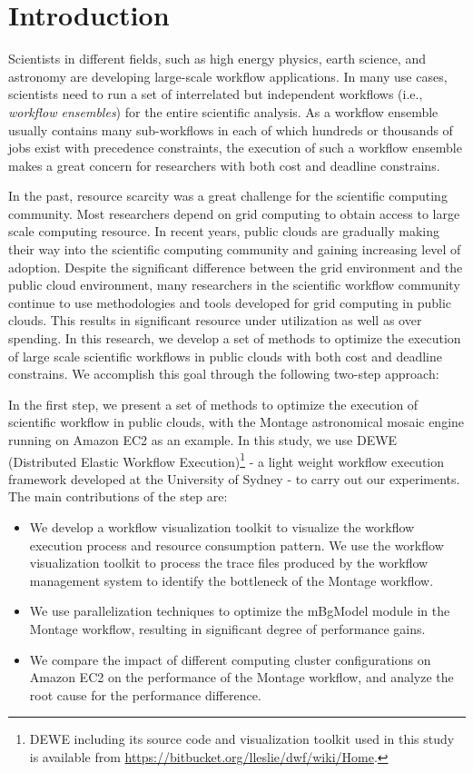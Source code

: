 \chapter{Introduction}
\label{chapter:introduction}

Scientists in different fields, such as high energy physics, earth science, and astronomy are developing large-scale workflow applications. In many use cases, scientists need to run a set of interrelated but independent workflows (i.e., \emph{workflow ensembles}) for the entire scientific analysis. As a workflow ensemble usually contains many sub-workflows in each of which hundreds or thousands of jobs exist with precedence constraints, the execution of such a workflow ensemble makes a great concern for researchers with both cost and deadline constrains.

In the past, resource scarcity was a great challenge for the scientific computing community. Most researchers depend on grid computing to obtain access to large scale computing resource. In recent years, public clouds are gradually making their way into the scientific computing community and  gaining increasing level of adoption. Despite the significant difference between the grid environment and the public cloud environment, many researchers in the scientific workflow community continue to use methodologies and tools developed for grid computing in public clouds. This results in significant resource under utilization as well as over spending. In this research, we develop a set of methods to optimize the execution of large scale scientific workflows in public clouds with both cost and deadline constrains. We accomplish this goal through the following two-step approach: 

In the first step, we present a set of methods to optimize the execution of scientific workflow in public clouds, with the Montage astronomical mosaic engine running on Amazon EC2 as an example. In this study, we use DEWE (Distributed Elastic Workflow Execution)\footnote{DEWE including its source code and visualization toolkit used in this study is available from \url{https://bitbucket.org/lleslie/dwf/wiki/Home}.} - a light weight workflow execution framework developed at the University of Sydney - to carry out our experiments. The main contributions of the step are:

\begin{itemize}
	\item We develop a workflow visualization toolkit to visualize the workflow execution process and resource consumption pattern. We use the workflow visualization toolkit to process the trace files produced by the workflow management system to identify the bottleneck of the Montage workflow.
	\item We use parallelization techniques to optimize the mBgModel module in the Montage workflow, resulting in significant degree of performance gains.
	\item We compare the impact of different computing cluster configurations on Amazon EC2 on the performance of the Montage workflow, and analyze the root cause for the performance difference. 
\end{itemize}


